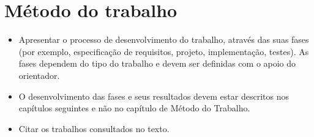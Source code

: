 \chapter{Método do trabalho} \label{cap:metodo}

\begin{itemize}
    \item Apresentar o processo de desenvolvimento do trabalho, através das suas fases (por exemplo, especificação de requisitos, projeto, implementação, testes). As fases dependem do tipo do trabalho e devem ser definidas com o apoio do orientador.
    \item O desenvolvimento das fases e seus resultados devem estar descritos nos capítulos seguintes e não no capítulo de Método do Trabalho.
    \item Citar os trabalhos consultados no texto.
\end{itemize}